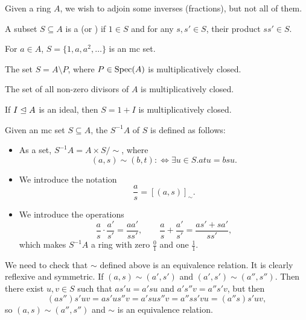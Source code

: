
Given a ring $A$, we wish to adjoin some inverses (fractions), but not all of
them.

\begin{definition}
  A subset $S \subseteq A$ is a  (or
  ) if $1 \in S$ and for any $s, s' \in S$, their product $s s'
  \in S$.
\end{definition}

\begin{example}
  For $a \in A$, $S = \{1, a, a^2, \ldots\}$ is an mc set.
\end{example}

\begin{example}
  The set $S = A \setminus P$, where $P \in \operatorname{Spec}(A)$ is multiplicatively
  closed.
\end{example}

\begin{example}
  The set of all non-zero divisors of $A$ is multiplicatively closed.
\end{example}

\begin{example}
  If $I \trianglelefteq A$ is an ideal, then $S = 1 + I$ is multiplicatively
  closed.
\end{example}

\begin{definition}
  Given an mc set $S \subseteq A$, the  $S^{-1} A$ of $S$ is
  defined as follows:
  \begin{itemize}
  \item As a set, $S^{-1} A = A \times S / \sim$, where
	\[
	  (a, s) \sim (b, t) :\iff \exists u \in S . atu = bsu.
	\]
  \item We introduce the notation
	\[
	  \frac{a}{s} = [(a,s)]_\sim.
	\]
  \item We introduce the operations
	\[
	  \frac{a}{s} \cdot \frac{a'}{s'} = \frac{aa'}{ss'},
	  \qquad
	  \frac{a}{s} + \frac{a'}{s'} = \frac{as' + sa'}{ss'},
	\]
	which makes $S^{-1} A$ a ring with zero $\frac{0}{1}$ and one $\frac{1}{1}$.
  \end{itemize}
\end{definition}

We need to check that $\sim$ defined above is an equivalence relation.
It is clearly reflexive and symmetric.
If $(a,s) \sim (a', s')$ and $(a', s') \sim (a'', s'')$.
Then there exist $u, v \in S$ such that $as'u = a'su$ and $a's''v = a''s'v$, but
then
\[
  (a s'') s'uv = as'u s''v = a'su s''v = a'' s s' v u = (a'' s) s'uv,
\]
so $(a, s) \sim (a'', s'')$ and $\sim$ is an equivalence relation.

